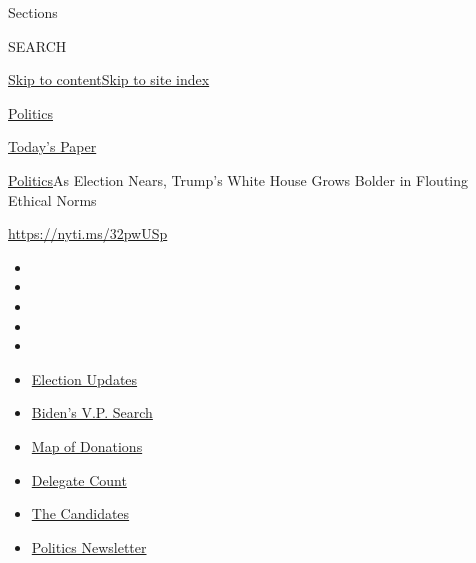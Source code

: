 Sections

SEARCH

\protect\hyperlink{site-content}{Skip to
content}\protect\hyperlink{site-index}{Skip to site index}

\href{https://www.nytimes.com/section/politics}{Politics}

\href{https://myaccount.nytimes.com/auth/login?response_type=cookie\&client_id=vi}{}

\href{https://www.nytimes.com/section/todayspaper}{Today's Paper}

\href{/section/politics}{Politics}\textbar{}As Election Nears, Trump's
White House Grows Bolder in Flouting Ethical Norms

\url{https://nyti.ms/32pwUSp}

\begin{itemize}
\item
\item
\item
\item
\item
\end{itemize}

\begin{itemize}
\item
  \href{https://www.nytimes.com/2020/07/31/us/elections/biden-vs-trump.html?action=click\&pgtype=Article\&state=default\&region=TOP_BANNER\&context=storylines_menu}{Election
  Updates}
\item
  \href{https://www.nytimes.com/article/biden-vice-president-2020.html?action=click\&pgtype=Article\&state=default\&region=TOP_BANNER\&context=storylines_menu}{Biden's
  V.P. Search}
\item
  \href{https://www.nytimes.com/interactive/2020/07/24/us/politics/trump-biden-campaign-donors.html?action=click\&pgtype=Article\&state=default\&region=TOP_BANNER\&context=storylines_menu}{Map
  of Donations}
\item
  \href{https://www.nytimes.com/interactive/2020/us/elections/delegate-count-primary-results.html?action=click\&pgtype=Article\&state=default\&region=TOP_BANNER\&context=storylines_menu}{Delegate
  Count}
\item
  \href{https://www.nytimes.com/interactive/2019/us/politics/2020-presidential-candidates.html?action=click\&pgtype=Article\&state=default\&region=TOP_BANNER\&context=storylines_menu}{The
  Candidates}
\item
  \href{https://www.nytimes.com/newsletters/politics?action=click\&pgtype=Article\&state=default\&region=TOP_BANNER\&context=storylines_menu}{Politics
  Newsletter}
\end{itemize}

